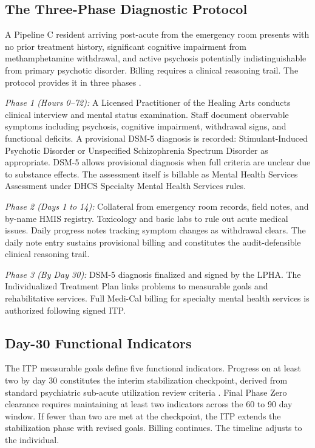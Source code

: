\documentclass[12pt, letterpaper]{article}
\begin{document}
\subsection{The Three-Phase Diagnostic Protocol}

A Pipeline C resident arriving post-acute from the emergency room presents with no prior treatment history, significant cognitive impairment from methamphetamine withdrawal, and active psychosis potentially indistinguishable from primary psychotic disorder. Billing requires a clinical reasoning trail. The protocol provides it in three phases \citep{dhcs_mhrc_2024}.

\textit{Phase 1 (Hours 0--72):} A Licensed Practitioner of the Healing Arts conducts clinical interview and mental status examination. Staff document observable symptoms including psychosis, cognitive impairment, withdrawal signs, and functional deficits. A provisional DSM-5 diagnosis is recorded: Stimulant-Induced Psychotic Disorder or Unspecified Schizophrenia Spectrum Disorder as appropriate. DSM-5 allows provisional diagnosis when full criteria are unclear due to substance effects. The assessment itself is billable as Mental Health Services Assessment under DHCS Specialty Mental Health Services rules.

\textit{Phase 2 (Days 1 to 14):} Collateral from emergency room records, field notes, and by-name HMIS registry. Toxicology and basic labs to rule out acute medical issues. Daily progress notes tracking symptom changes as withdrawal clears. The daily note entry sustains provisional billing and constitutes the audit-defensible clinical reasoning trail.

\textit{Phase 3 (By Day 30):} DSM-5 diagnosis finalized and signed by the LPHA. The Individualized Treatment Plan links problems to measurable goals and rehabilitative services. Full Medi-Cal billing for specialty mental health services is authorized following signed ITP.

\subsection{Day-30 Functional Indicators}

The ITP measurable goals define five functional indicators. Progress on at least two by day 30 constitutes the interim stabilization checkpoint, derived from standard psychiatric sub-acute utilization review criteria \citep{dhcs_mhrc_2024}. Final Phase Zero clearance requires maintaining at least two indicators across the 60 to 90 day window. If fewer than two are met at the checkpoint, the ITP extends the stabilization phase with revised goals. Billing continues. The timeline adjusts to the individual.
\end{document}

